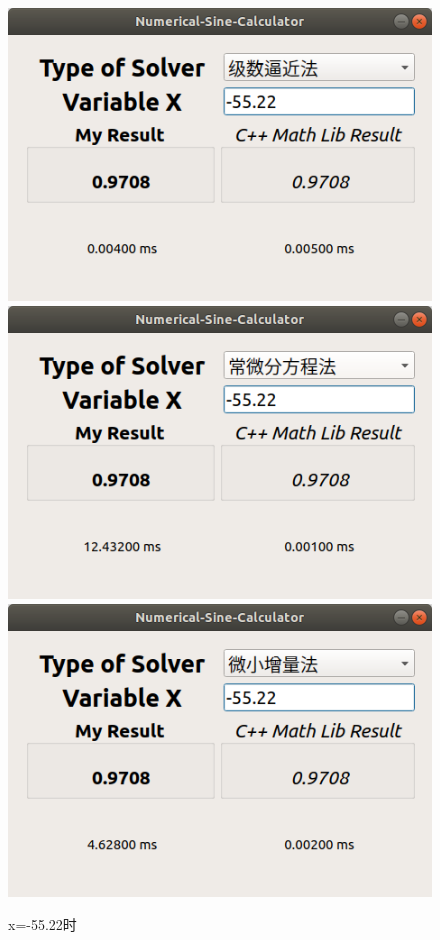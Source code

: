 \documentclass[UTF8]{ctexart}
\begin{document}
\begin{figure}[H]
    \centering
    \includegraphics[scale=0.25]{images/series-5522.png}
    \includegraphics[scale=0.25]{images/diff-5522.png}
    \includegraphics[scale=0.25]{images/delta-5522.png}
    \caption{x=-55.22时}
\end{figure}
\end{document}
